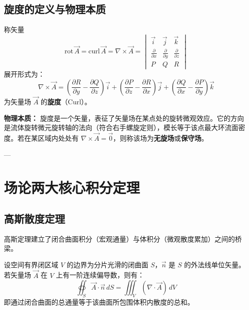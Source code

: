 \subsection{旋度的定义与物理本质}
\begin{tcolorbox}[colback=blue!5!white, colframe=blue!75!black, title=定义 \thechapter.4 \quad 旋度]
	称矢量
	$$ \text{rot}\,\vec{A} = \text{curl}\,\vec{A} = \nabla \times \vec{A} = \begin{vmatrix} \vec{i} & \vec{j} & \vec{k} \\ \frac{\partial}{\partial x} & \frac{\partial}{\partial y} & \frac{\partial}{\partial z} \\ P & Q & R \end{vmatrix} $$
	展开形式为：
	$$ \nabla \times \vec{A} = \left( \frac{\partial R}{\partial y} - \frac{\partial Q}{\partial z} \right)\vec{i} + \left( \frac{\partial P}{\partial z} - \frac{\partial R}{\partial x} \right)\vec{j} + \left( \frac{\partial Q}{\partial x} - \frac{\partial P}{\partial y} \right)\vec{k} $$
	为矢量场 $\vec{A}$ 的\textbf{旋度}（Curl）。
\end{tcolorbox}

\textbf{物理本质：} 旋度是一个矢量，表征了矢量场在某点处的旋转微观效应。它的方向是流体旋转微元旋转轴的法向（符合右手螺旋定则），模长等于该点最大环流面密度。若在某区域内处处有 $\nabla \times \vec{A} = \vec{0}$，则称该场为\textbf{无旋场}或\textbf{保守场}。

---

\section{场论两大核心积分定理}

\subsection{高斯散度定理}
高斯定理建立了闭合曲面积分（宏观通量）与体积分（微观散度累加）之间的桥梁。
\begin{tcolorbox}[colback=teal!5!white, colframe=teal!75!black, title=定理 \thechapter.1 \quad 高斯散度定理 (Gauss's Theorem)]
	设空间有界闭区域 $V$ 的边界为分片光滑的闭曲面 $S$，$\vec{n}$ 是 $S$ 的外法线单位矢量。若矢量场 $\vec{A}$ 在 $V$ 上有一阶连续偏导数，则有：
	$$ \oiint_{S} \vec{A} \cdot \vec{n}\, dS = \iiint_{V} (\nabla \cdot \vec{A})\, dV $$
	即通过闭合曲面的总通量等于该曲面所包围体积内散度的总和。
\end{tcolorbox}

